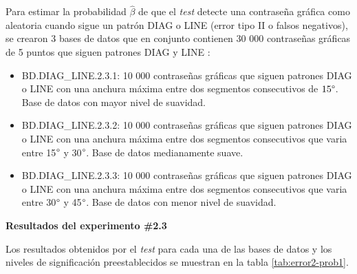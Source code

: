 \documentclass[12pt]{report}
\begin{document}
Para estimar la probabilidad $\hat{\beta}$ de que el \textit{test} detecte una contraseña gráfica como aleatoria cuando sigue un patrón DIAG o LINE (error tipo II o falsos negativos), se crearon 3 bases de datos que en conjunto contienen 30 000 contraseñas gráficas de 5 puntos que siguen patrones DIAG y LINE :
\begin{itemize}
	\item BD.DIAG\_LINE.2.3.1: 10 000 contraseñas gráficas que siguen patrones DIAG o LINE con una anchura máxima entre dos segmentos consecutivos de $15\degree$. Base de datos con mayor nivel de suavidad. 
	\item BD.DIAG\_LINE.2.3.2: 10 000 contraseñas gráficas que siguen patrones DIAG o LINE con una anchura máxima entre dos segmentos consecutivos que varia entre 15$\degree$ y 30$\degree$. Base de datos medianamente suave. 
	\item BD.DIAG\_LINE.2.3.3: 10 000 contraseñas gráficas que siguen patrones DIAG o LINE con una anchura máxima entre dos segmentos consecutivos que varia entre 30$\degree$ y 45$\degree$. Base de datos con menor nivel de suavidad.
\end{itemize}
\textbf{Resultados del experimento \#2.3}

Los resultados obtenidos por el \textit{test}  para cada una de las bases de datos y los  niveles de significación preestablecidos se muestran en la tabla \ref{tab:error2-prob1}.
\end{document}

